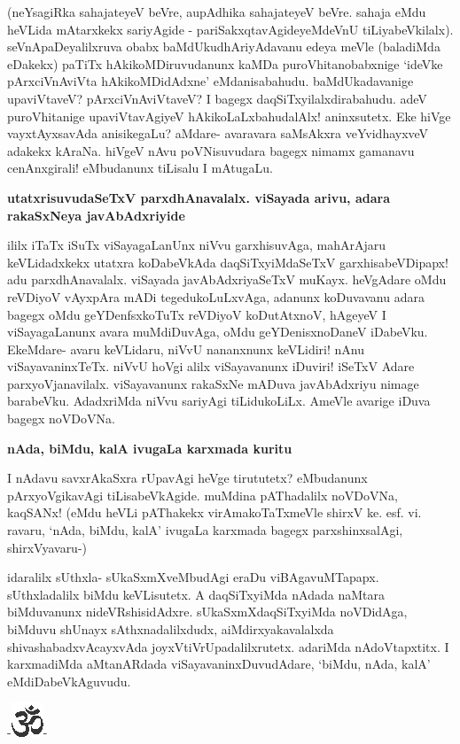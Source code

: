 (neYsagiRka sahajateyeV beVre, aupAdhika sahajateyeV beVre. sahaja eMdu heVLida mAtarxkekx sariyAgide - pariSakxqtavAgideyeMdeVnU tiLiyabeVkilalx). seVnApaDeyalilxruva obabx baMdUkudhAriyAdavanu edeya meVle (baladiMda eDakekx) paTiTx hAkikoMDiruvudanunx kaMDa puroVhitanobabxnige `ideVke pArxciVnAviVta hAkikoMDidAdxne' eMdanisabahudu. baMdUkadavanige upaviVtaveV? pArxciVnAviVtaveV? I bagegx daqSiTxyilalxdirabahudu. adeV puroVhitanige upaviVtavAgiyeV hAkikoLaLxbahudalAlx! aninxsutetx. Eke hiVge vayxtAyxsavAda anisikegaLu? aMdare- avaravara saMsAkxra veYvidhayxveV adakekx kAraNa. hiVgeV nAvu poVNisuvudara bagegx nimamx gamanavu cenAnxgirali! eMbudanunx tiLisalu I mAtugaLu.

\noindent
{\bf\large{utatxrisuvudaSeTxV parxdhAnavalalx. viSayada arivu, adara rakaSxNeya javAbAdxriyide}}\label{page176}

ililx iTaTx iSuTx viSayagaLanUnx niVvu garxhisuvAga, mahArAjaru keVLidadxkekx utatxra koDabeVkAda daqSiTxyiMdaSeTxV garxhisabeVDipapx! adu parxdhAnavalalx. viSayada javAbAdxriyaSeTxV muKayx. heVgAdare oMdu reVDiyoV vAyxpAra mADi tegedukoLuLxvAga, adanunx koDuvavanu adara bagegx oMdu geYDenfsxkoTuTx reVDiyoV koDutAtxnoV, hAgeyeV I viSayagaLanunx avara muMdiDuvAga, oMdu geYDenisxnoDaneV iDabeVku. EkeMdare- avaru keVLidaru, niVvU nananxnunx keVLidiri! nAnu viSayavaninxTeTx. niVvU hoVgi alilx viSayavanunx iDuviri! iSeTxV Adare parxyoVjanavilalx. viSayavanunx rakaSxNe mADuva javAbAdxriyu nimage barabeVku. AdadxriMda niVvu sariyAgi tiLidukoLiLx. AmeVle avarige iDuva bagegx noVDoVNa.

\noindent
{\bf\large{nAda, biMdu, kalA ivugaLa karxmada kuritu}}\label{page177}

I nAdavu savxrAkaSxra rUpavAgi heVge tirututetx? eMbudanunx pArxyoVgikavAgi tiLisabeVkAgide. muMdina pAThadalilx noVDoVNa, kaqSANx! (eMdu heVLi pAThakekx virAmakoTaTxmeVle shirxV ke. esf. vi. ravaru, `nAda, biMdu, kalA' ivugaLa karxmada bagegx parxshinxsalAgi, shirxVyavaru-)

idaralilx sUthxla- sUkaSxmXveMbudAgi eraDu viBAgavuMTapapx. sUthxladalilx biMdu keVLisutetx. A daqSiTxyiMda nAdada naMtara biMduvanunx nideVRshisidAdxre. sUkaSxmXdaqSiTxyiMda noVDidAga, biMduvu shUnayx sAthxnadalilxdudx, aiMdirxyakavalalxda shivashabadxvAcayxvAda joyxVtiVrUpadalilxrutetx. adariMda nAdoVtapxtitx. I karxmadiMda aMtanARdada viSayavaninxDuvudAdare, `biMdu, nAda, kalA' eMdiDabeVkAguvudu.

\begin{center}
-\includegraphics{om.eps}-
\end{center}

